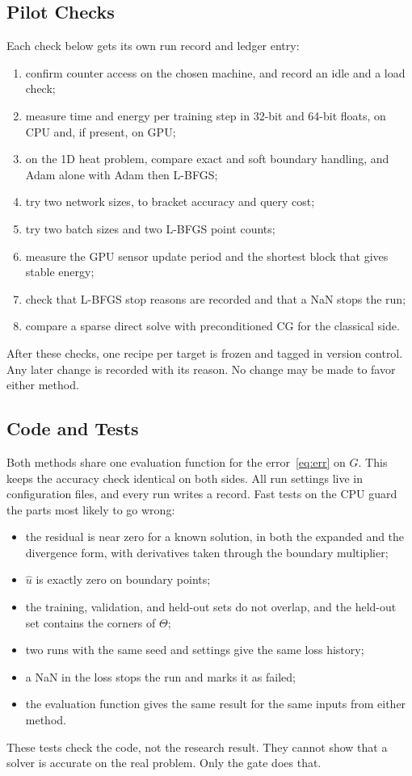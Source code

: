 \documentclass[journal]{IEEEtran}
\begin{document}
\subsection{Pilot Checks}
Each check below gets its own run record and ledger entry:
\begin{enumerate}
\item confirm counter access on the chosen machine, and record an idle and a load check;
\item measure time and energy per training step in 32-bit and 64-bit floats, on CPU and, if present, on GPU;
\item on the 1D heat problem, compare exact and soft boundary handling, and Adam alone with Adam then L-BFGS;
\item try two network sizes, to bracket accuracy and query cost;
\item try two batch sizes and two L-BFGS point counts;
\item measure the GPU sensor update period and the shortest block that gives stable energy;
\item check that L-BFGS stop reasons are recorded and that a NaN stops the run;
\item compare a sparse direct solve with preconditioned CG for the classical side.
\end{enumerate}
After these checks, one recipe per target is frozen and tagged in version control. Any later change is recorded with its reason. No change may be made to favor either method.

\subsection{Code and Tests}
Both methods share one evaluation function for the error~\eqref{eq:err} on $G$. This keeps the accuracy check identical on both sides. All run settings live in configuration files, and every run writes a record. Fast tests on the CPU guard the parts most likely to go wrong:
\begin{itemize}
\item the residual is near zero for a known solution, in both the expanded and the divergence form, with derivatives taken through the boundary multiplier;
\item $\hat u$ is exactly zero on boundary points;
\item the training, validation, and held-out sets do not overlap, and the held-out set contains the corners of $\Theta$;
\item two runs with the same seed and settings give the same loss history;
\item a NaN in the loss stops the run and marks it as failed;
\item the evaluation function gives the same result for the same inputs from either method.
\end{itemize}
These tests check the code, not the research result. They cannot show that a solver is accurate on the real problem. Only the gate does that.
\end{document}
